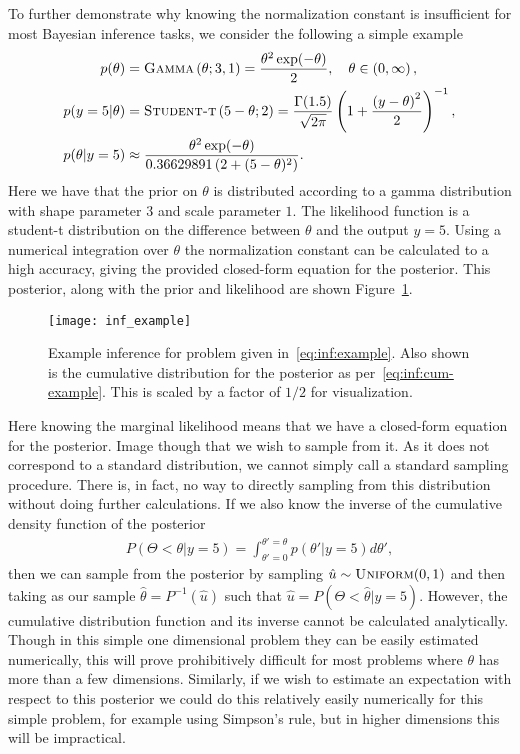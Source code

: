 To further demonstrate why knowing the normalization constant is insufficient
for most Bayesian inference tasks, we consider the following a simple example
\begin{subequations}
\label{eq:inf:example}
\begin{align}
p(\theta) &= \textsc{Gamma}\left(\theta; 3, 1\right) = \frac{\theta^2 \exp(-\theta)}{2},
 \quad \theta\in\left(0,\infty\right), \\
p(y=5|\theta) &= \textsc{Student-t}\left(5-\theta;2\right) = 
\frac{\Gamma (1.5)}{\sqrt{2\pi}}\left(1+\frac{\left(y-\theta\right)^2}{2}\right)^{-1}, \\
p(\theta |y=5) &\approx \frac{\theta^2
	 \exp(-\theta)}{0.36629891\left(2+(5-\theta)^2\right)}.
\end{align}
\end{subequations}
Here we have that the prior on $\theta$ is distributed according to a gamma
distribution with shape parameter $3$ and scale parameter $1$.  The likelihood
function is a student-t distribution on the difference between $\theta$ and the
output $y=5$.  Using a numerical integration over $\theta$ the normalization
constant can be calculated to a high accuracy, giving the provided closed-form
equation for the posterior.  This posterior, along with the prior and likelihood are shown Figure~\ref{fig:inf:inf-example}.

\begin{figure}[t]
	\centering
	\texttt{[image: inf\_example]}
	\caption{Example inference for problem given
		in~\eqref{eq:inf:example}. Also shown is the cumulative distribution for
		the posterior as per~\eqref{eq:inf:cum-example}.  This is scaled by a factor
		of $1/2$ for visualization.  \label{fig:inf:inf-example}}
\end{figure}

Here knowing the marginal likelihood means that we have a 
closed-form equation for the posterior.  Image though that we 
wish to sample from it.  As it does not correspond to a standard distribution,
we cannot simply call a standard sampling procedure.  There is, in fact, no way
to directly sampling from this distribution without doing further calculations.  If
we also know the inverse of the cumulative density function of the posterior
\begin{align}
\label{eq:inf:cum-example}
P(\Theta<\theta | y=5) = \int_{\theta'=0}^{\theta'=\theta}  p(\theta' | y=5) d\theta',
\end{align}
then we can sample from the posterior by sampling $\hat{u} \sim \textsc{Uniform}(0,1)$ and
then taking as our sample $\hat{\theta} = P^{-1}(\hat{u})$ such that 
$\hat{u} = P(\Theta<\hat{\theta} | y=5)$.  However, the cumulative distribution function
and its inverse cannot be calculated analytically.  Though in this simple one dimensional
problem they can be easily estimated numerically, this will prove prohibitively difficult
for most problems where $\theta$ has more than a few dimensions.  Similarly, if we
wish to estimate an expectation with respect to this posterior we could do this relatively
easily numerically for this simple problem, for example using Simpson's rule, but in higher
dimensions this will be impractical.

